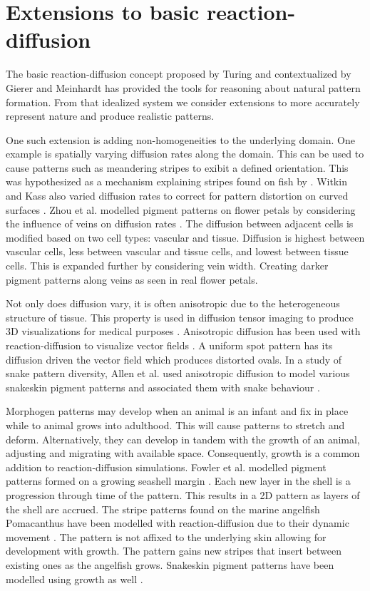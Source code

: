 \section{Extensions to basic reaction-diffusion}

The basic reaction-diffusion concept proposed by Turing and contextualized by Gierer and Meinhardt has provided the tools for reasoning about natural pattern formation. From that idealized system we consider extensions to more accurately represent nature and produce realistic patterns.

One such extension is adding non-homogeneities to the underlying domain. One example is spatially varying diffusion rates along the domain. This can be used to cause patterns such as meandering stripes to exibit a defined orientation. This was hypothesized as a mechanism explaining stripes found on fish by \cite{zheng2009}. Witkin and Kass also varied diffusion rates to correct for pattern distortion on curved surfaces \cite{Witkin1991}. Zhou et al. modelled pigment patterns on flower petals by considering the influence of veins on diffusion rates \cite{Zhou2007}. The diffusion between adjacent cells is modified based on two cell types: vascular and tissue. Diffusion is highest between vascular cells, less between vascular and tissue cells, and lowest between tissue cells. This is expanded further by considering vein width. Creating darker pigment patterns along veins as seen in real flower petals.

Not only does diffusion vary, it is often anisotropic due to the heterogeneous structure of tissue. This property is used in diffusion tensor imaging to produce 3D visualizations for medical purposes \cite{Bihan2001}. Anisotropic diffusion has been used with reaction-diffusion to visualize vector fields \cite{Sanderson2004}. A uniform spot pattern has its diffusion driven the vector field which produces distorted ovals. In a study of snake pattern diversity, Allen et al. used anisotropic diffusion to model various snakeskin pigment patterns and associated them with snake behaviour \cite{Allen2013}.

Morphogen patterns may develop when an animal is an infant and fix in place while to animal grows into adulthood. This will cause patterns to stretch and deform. Alternatively, they can develop in tandem with the growth of an animal, adjusting and migrating with available space. Consequently, growth is a common addition to reaction-diffusion simulations. Fowler et al. modelled pigment patterns formed on a growing seashell margin \cite{fowler1992modeling}. Each new layer in the shell is a progression through time of the pattern. This results in a 2D pattern as layers of the shell are accrued. The stripe patterns found on the marine angelfish Pomacanthus have been modelled with reaction-diffusion due to their dynamic movement \cite{Kondo1995}. The pattern is not affixed to the underlying skin allowing for development with growth. The pattern gains new stripes that insert between existing ones as the angelfish grows. Snakeskin pigment patterns have been modelled using growth as well \cite{MURRAY1991}.

